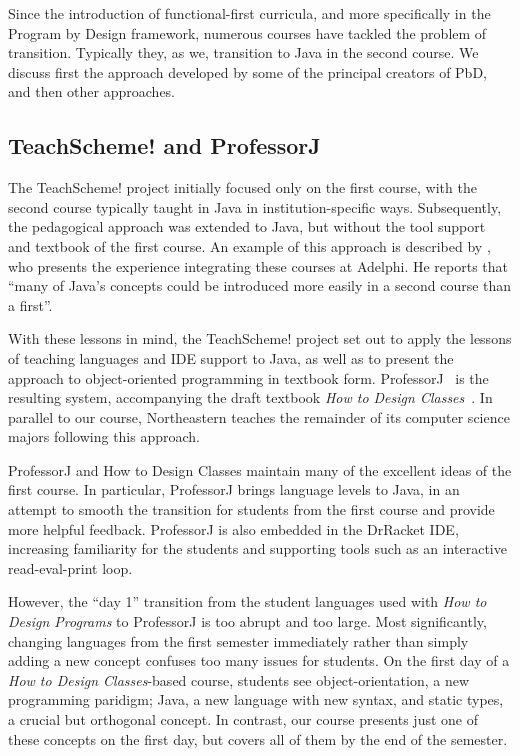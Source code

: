 \documentclass[submission,copyright]{eptcs}
\def\htdp{\emph{How to Design Programs}\xspace}
\def\htdc{\emph{How to Design Classes}\xspace}
\def\profj{{ProfessorJ}\xspace}
\begin{document}
Since the introduction of functional-first curricula, and more
specifically in the Program by Design framework, numerous courses have
tackled the problem of transition.  Typically they, as we, transition
to Java in the second course.  We discuss first the approach developed
by some of the principal creators of PbD, and then other approaches.

\subsection{TeachScheme! and ProfessorJ}

The TeachScheme! project initially focused only on the first course,
with the second course typically taught in Java in
institution-specific ways. Subsequently, the pedagogical approach was
extended to Java, but without the tool support and textbook of the
first course.  An example of this approach is described by
\citet{dvanhorn:Bloch2000Scheme}, who presents the experience
integrating these courses at Adelphi.  He reports that ``many of
Java's concepts could be introduced more easily in a second course
than a first''.

With these lessons in mind, the TeachScheme! project set out to apply
the lessons of teaching languages and IDE support to Java, as well as
to present the approach to object-oriented programming in textbook
form. ProfessorJ~\cite{dvanhorn:Gray2003ProfessorJ} is the resulting
system, accompanying the draft textbook \emph{How to Design
  Classes}~\cite{local:htdc}.  In parallel to our course, Northeastern
teaches the remainder of its computer science majors following this
approach.

ProfessorJ and How to Design Classes maintain many of the excellent
ideas of the first course.  In particular, ProfessorJ brings language
levels to Java, in an attempt to smooth the transition for students
from the first course and provide more helpful feedback.  ProfessorJ
is also embedded in the DrRacket IDE, increasing familiarity for the
students and supporting tools such as an interactive read-eval-print
loop. 


However, the ``day 1'' transition from the student languages used with
\htdp to \profj is too abrupt and too large.
%
Most significantly, changing languages from the first semester
immediately rather than simply adding a new concept confuses too many
issues for students.  On the first day of a \htdc-based course,
students see object-orientation, a new programming paridigm; Java, a
new language with new syntax, and static types, a crucial but
orthogonal concept.
%
In contrast, our course presents just one of these concepts on the
first day, but  covers all of them by the end of the semester.
\end{document}
